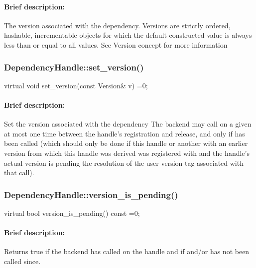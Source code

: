 \paragraph{Brief description:} The version associated with the dependency.
       Versions are strictly ordered, hashable, incrementable objects for which the default constructed
       value is always less than or equal to all values.  See Version concept for more information
     
    
\subsubsection{DependencyHandle::set\_version()}
\begin{CppCode}
    virtual void
    set_version(const Version& v) =0;
\end{CppCode}

\paragraph{Brief description:} Set the version associated with the dependency
       The backend may call  on a given  at most one time between
       the handle's registration and release, and only if  has been
       called (which should only be done if this handle or another with an earlier version from
       which this handle was derived was registered with 
       and the handle's actual version is pending the resolution of the user version tag associated
       with that call).
     

\subsubsection{DependencyHandle::version\_is\_pending()}
\begin{CppCode}
    virtual bool
    version_is_pending() const =0;
\end{CppCode}

\paragraph{Brief description:} Returns true if the backend has called  on the handle
       and if  and/or  has not been called since.
     

